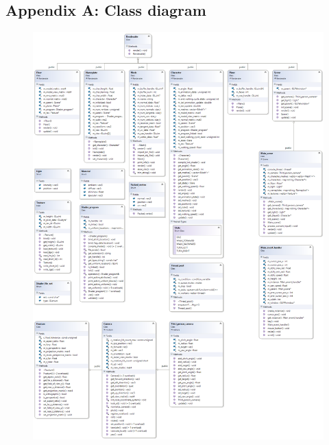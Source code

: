\documentclass[12pt]{article}
\begin{document}
	\subsection{Appendix A: Class diagram}
	\begin{figure}[t]
		\centering
		\includegraphics[width=\paperwidth, height=\paperheight]{class_diagram}
		\caption{}
		\label{fig:class_diagram}
	\end{figure}
	\restoregeometry
	
\end{document}
